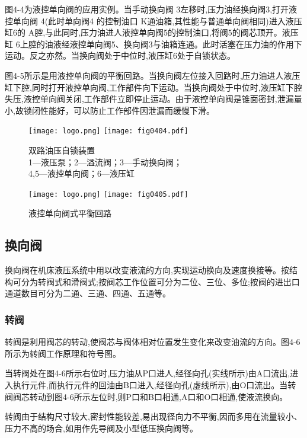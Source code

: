 图4-4为液控单向阀的应用实例。当手动换向阀 3左移时,压力油经换向阀3,打开液控单向阀 4(此时单向阀4 的控制油口 K通油箱,其性能与普通单向阀相同)进入液压缸6的 A腔,与此同时,压力油进人液控单向阀5的控制油口,将阀5的阀芯顶开。液压缸 6上腔的油液经液控单向阀5、换向阀3与油箱连通。此时活塞在压力油的作用下运动。反之亦然。当换向阀处于中位时,液压缸6处于自锁状态。

图4-5所示是用液控单向阀的平衡回路。当换向阀左位接入回路时,压力油进人液压缸下腔,同时打开液控单向阀,工作部件向下运动。当换向阀处于中位时,液压缸下腔失压,液控单向阀关闭,工作部件立即停止运动。由于液控单向阀是锥面密封,泄漏量小,故锁闭性能好，可以防止工作部件因泄漏而缓慢下滑。

\begin{figure}[htbp]\centering
\ifOpenSource
\texttt{[image: logo.png]}
\else
\texttt{[image: fig0404.pdf]}
\fi
\caption{双路油压自锁装置\\1—液压泵；2—溢流阀；3—手动换向阀；\\4,5—液控单向阀；6—液压缸}
\label{fig:fig0404}
\end{figure}

\begin{figure}[htbp]\centering
\ifOpenSource
\texttt{[image: logo.png]}
\else
\texttt{[image: fig0405.pdf]}
\fi
\caption{液控单向阀式平衡回路}
\label{fig:fig0405}
\end{figure}

\subsection{换向阀}

换向阀在机床液压系统中用以改变液流的方向,实现运动换向及速度换接等。按结构可分为转阀式和滑阀式;按阀芯工作位置可分为二位、三位、多位;按阀的进出口通道数目可分为二通、三通、四通、五通等。

\subsubsection{转阀}

转阀是利用阀芯的转动,使阀芯与阀体相对位置发生变化来改变油流的方向。图4-6所示为转阀工作原理和符号图。

当转阀处在图4-6所示右位时,压力油从P口进人,经径向孔(实线所示)由A口流出,进入执行元件,而执行元件的回油由B口进入,经径向孔(虚线所示),由O口流出。当转阀阀芯转动到图4-6所示左位时,则P口和B口相通,A口和O口相通,使液流换向。

转阀由于结构尺寸较大,密封性能较差,易出现径向力不平衡,因而多用在流量较小、压力不高的场合,如用作先导阀及小型低压换向阀等。

